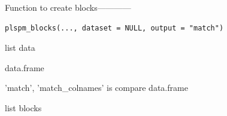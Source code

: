 \documentclass[a4paper]{book}
\begin{document}
%
\begin{Description}
Function to create blocks------------
\end{Description}
%
\begin{Usage}
\begin{verbatim}
plspm_blocks(..., dataset = NULL, output = "match")
\end{verbatim}
\end{Usage}
%
\begin{Arguments}
\begin{ldescription}
\item[\code{...}] list data

\item[\code{dataset}] data.frame

\item[\code{output}] 'match', 'match\_colnames' is compare data.frame
\end{ldescription}
\end{Arguments}
%
\begin{Value}
list blocks
\end{Value}
%
\end{document}
